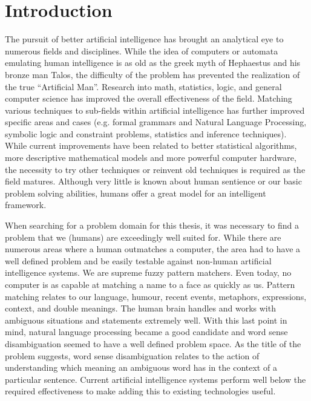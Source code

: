 \chapter{Introduction}

The pursuit of better artificial intelligence has brought an analytical eye to
numerous fields and disciplines.  While the idea of computers or automata
emulating human intelligence is as old as the greek myth of Hephaestus and his
bronze man Talos\cite{TALOS}, the difficulty of the problem has prevented the 
realization of the true ``Artificial Man''.  Research into math, statistics, logic, and general
computer science has improved the overall effectiveness of the field. Matching
various techniques to sub-fields within artificial intelligence has further
improved specific areas and cases (e.g. formal grammars and Natural Language
Processing, symbolic logic and constraint problems, statistics and inference
techniques). While current improvements have been related to better statistical
algorithms, more descriptive mathematical models and more powerful computer
hardware, the necessity to try other techniques or reinvent old techniques is
required as the field matures.  Although very little is known about human
sentience or our basic problem solving abilities, humans offer a great model for
an intelligent framework.

When searching for a problem domain for this thesis, it was necessary to find a
problem that we (humans) are exceedingly well suited for.  While there are
numerous areas where a human outmatches a computer, the area had to have a well
defined problem and be easily testable against non-human artificial intelligence
systems.  We are supreme fuzzy pattern matchers.  Even today, no computer is as
capable at matching a name to a face as quickly as us.  Pattern matching relates
to our language, humour, recent events, metaphors, expressions, context, and
double meanings. The human brain handles and works with ambiguous situations and
statements extremely well.  With this last point in mind, natural
language processing became a good candidate and word sense disambiguation seemed
to have a well defined problem space.  As the title of the problem suggests,
word sense disambiguation relates to the action of understanding which meaning
an ambiguous word has in the context of a particular sentence. Current
artificial intelligence systems perform well below the required effectiveness to
make adding this to existing technologies useful.

